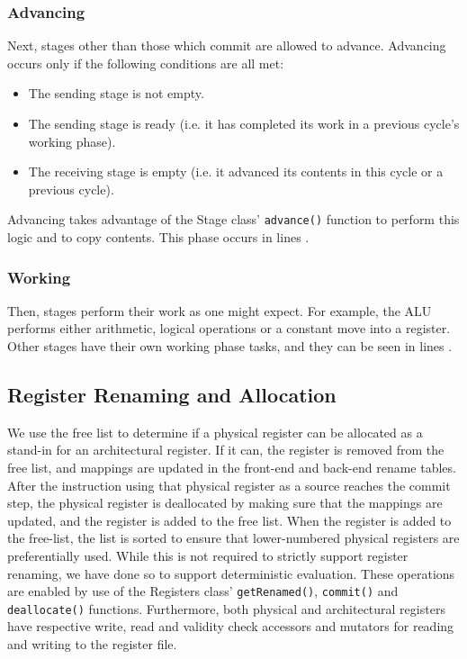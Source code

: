 \documentclass[12pt]{article}
\begin{document}
\subsubsection{Advancing}
Next, stages other than those which commit are allowed to advance.
Advancing occurs only if the following conditions are all met:
\begin{itemize}
  \item The sending stage is not empty.
  \item The sending stage is ready (i.e. it has completed its work in a previous cycle's working phase).
  \item The receiving stage is empty (i.e. it advanced its contents in this cycle or a previous cycle).
\end{itemize}
Advancing takes advantage of the Stage class' \texttt{advance()} function to perform this logic and to copy contents.
This phase occurs in lines .

\subsubsection{Working}
Then, stages perform their work as one might expect. 
For example, the ALU performs either arithmetic, logical operations or a constant move into a register.
Other stages have their own working phase tasks, and they can be seen in lines .


\subsection{Register Renaming and Allocation}
\label{sec:renamealloc}
We use the free list to determine if a physical register can be allocated as a stand-in for an architectural register. 
If it can, the register is removed from the free list, and mappings are updated in the front-end and back-end rename tables. 
After the instruction using that physical register as a source reaches the commit step, the physical register is deallocated by making sure that the mappings are updated, and the register is added to the free list. 
When the register is added to the free-list, the list is sorted to ensure that lower-numbered physical registers are preferentially used.
While this is not required to strictly support register renaming, we have done so to support deterministic evaluation.
These operations are enabled by use of the Registers class' \texttt{getRenamed()}, \texttt{commit()} and \texttt{deallocate()} functions.
Furthermore, both physical and architectural registers have respective write, read and validity check accessors and mutators for reading and writing to the register file.
\end{document}
